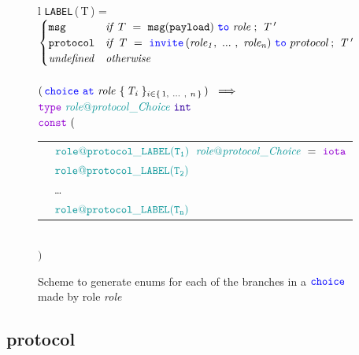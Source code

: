 \documentclass[12pt,twoside]{report}
\begin{document}
\begin{figure}[]
    \begin{center}
        \begin{tabular}{l}
            \texttt{LABEL}\,(\,T\,) = \\[3pt]
            \begin{math}
                \begin{cases}
                    \varname{msg} & \mathit{if}\ T\ =\ \scrmessage{msg}{payload}\ \scrto\ \mathit{role}\;;\ \mathit{T\,'}\\
                    \varname{protocol} & \mathit{if}\ \mathit{T}\ =\ \invite\,(\roles{role}{n})\ \scrto\ protocol\,;\ \mathit{T\,'}\\
                    \mathit{undefined} & \mathit{otherwise}
                \end{cases}
            \end{math}\\\\[6pt]

            $(\,\choice\ \at\ \mathit{role}\ \{\,\mathit{T_i}\;\}_{\varinset{i}{\{\,1,\ \dots\ ,\ n\,\}}}\,)\ \implies$\\[10pt]
            
            $\gotype\ \enumtype{\localprotocol{role}{protocol}\_Choice}\ \typename{int}$\\[6pt]
            $\goconst\ ($\\[3pt]
            \begin{tabular}{ll}
                \indent & $\enumvalue{\localprotocol{role}{protocol}\_LABEL(T_1)}\;\ \enumtype{\localprotocol{role}{protocol}\_Choice}\ =\ \goiota$ \\
                \indent & $\enumvalue{\localprotocol{role}{protocol}\_LABEL(T_2)}$ \\
                \indent & \dots \\
                \indent & $\enumvalue{\localprotocol{role}{protocol}\_LABEL(T_n)}$ \\
            \end{tabular}\\[3pt]
            $)$
        \end{tabular}
    \end{center}
    
    \caption{Scheme to generate enums for each of the branches in a ${\color{blue}\mathtt{choice}}$ made by role \textit{role}}
    \label{}
\end{figure}

\subsection{protocol}\label{entry-point}
\end{document}
